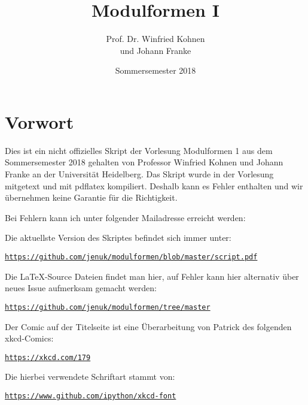 \documentclass[parskip=half]{scrbook}
\title{Modulformen I}
\author{Prof. Dr. Winfried Kohnen \\[0.2\baselineskip] und Johann Franke}
\date{Sommersemester 2018}
\begin{document}
\pagestyle{plain}

\maketitle

\chapter*{Vorwort}

Dies ist ein nicht offizielles Skript der Vorlesung Modulformen 1 aus dem Sommersemester 2018 gehalten von Professor Winfried Kohnen und Johann Franke an der Universität Heidelberg.
Das Skript wurde in der Vorlesung mitgetext und mit pdflatex kompiliert.
Deshalb kann es Fehler enthalten und wir übernehmen keine Garantie für die Richtigkeit.

Bei Fehlern kann ich unter folgender Mailadresse erreicht werden:
\begin{center}
\end{center}

Die aktuellste Version des Skriptes befindet sich immer unter:
\begin{center}
\texttt{\url{https://github.com/jenuk/modulformen/blob/master/script.pdf}}
\end{center}

Die \LaTeX-Source Dateien findet man hier, auf Fehler kann hier alternativ über neues Issue aufmerksam gemacht werden:
\begin{center}
\texttt{\url{https://github.com/jenuk/modulformen/tree/master}}
\end{center}

Der Comic auf der Titelseite ist eine Überarbeitung von Patrick des folgenden xkcd-Comics:
\begin{center}
\texttt{\url{https://xkcd.com/179}}
\end{center}

Die hierbei verwendete Schriftart stammt von:
\begin{center}
\texttt{\url{https://www.github.com/ipython/xkcd-font}}
\end{center}

\clearpage
{}
{}
\tableofcontents

\clearpage
{}
\setcounter{page}{0}
\pagestyle{fancy}


\end{document}
